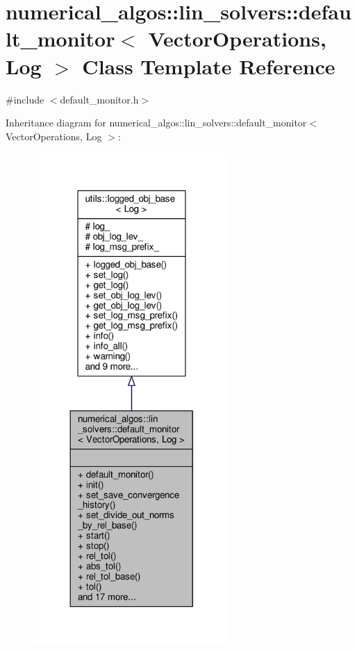 \hypertarget{classnumerical__algos_1_1lin__solvers_1_1default__monitor}{\section{numerical\-\_\-algos\-:\-:lin\-\_\-solvers\-:\-:default\-\_\-monitor$<$ Vector\-Operations, Log $>$ Class Template Reference}
\label{classnumerical__algos_1_1lin__solvers_1_1default__monitor}
}


{\ttfamily \#include $<$default\-\_\-monitor.\-h$>$}



Inheritance diagram for numerical\-\_\-algos\-:\-:lin\-\_\-solvers\-:\-:default\-\_\-monitor$<$ Vector\-Operations, Log $>$\-:
\nopagebreak
\begin{figure}[H]
\begin{center}
\leavevmode
\includegraphics[width=212pt]{classnumerical__algos_1_1lin__solvers_1_1default__monitor__inherit__graph}
\end{center}
\end{figure}


